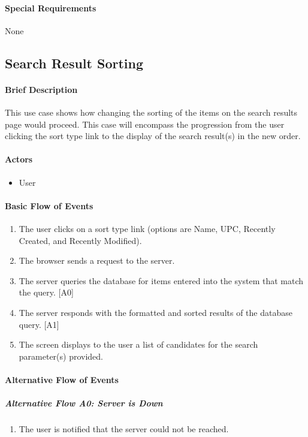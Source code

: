 \documentclass{article}
\begin{document}
\paragraph{Special Requirements}
None


\subsection{Search Result Sorting}

\paragraph{Brief Description}
This use case shows how changing the sorting of the items on the search results page would proceed. This case will encompass the progression from the user clicking the sort type link to the display of the search result(s) in the new order.

\paragraph{Actors}
\begin{itemize}
\item User
\end{itemize}

\paragraph{Basic Flow of Events}
\begin{enumerate}
\item The user clicks on a sort type link (options are Name, UPC, Recently Created, and Recently Modified).
\item The browser sends a request to the server.
\item The server queries the database for items entered into the system that match the query. [A0]
\item The server responds with the formatted and sorted results of the database query. [A1]
\item The screen displays to the user a list of candidates for the search parameter(s) provided.
\end{enumerate}

\paragraph{Alternative Flow of Events}

\subparagraph{Alternative Flow A0: Server is Down}
\begin{enumerate}
\item The user is notified that the server could not be reached.
\end{enumerate}
\end{document}
